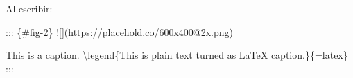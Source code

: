 \documentclass[
  letterpaper,
  DIV=11,
  numbers=noendperiod]{scrartcl}
\newenvironment{Shaded}{\begin{snugshade}}{\end{snugshade}}
\newcommand{\AlertTok}[1]{\textcolor[rgb]{0.68,0.00,0.00}{#1}}
\newcommand{\InformationTok}[1]{\textcolor[rgb]{0.37,0.37,0.37}{#1}}
\newcommand{\NormalTok}[1]{\textcolor[rgb]{0.00,0.23,0.31}{#1}}
\begin{document}
Al escribir:

\begin{Shaded}
\begin{Highlighting}[]
\NormalTok{::: \{\#fig{-}2\}}
\AlertTok{![](https://placehold.co/600x400@2x.png)}

\NormalTok{This is a caption.  }
\InformationTok{\textasciigrave{}\textbackslash{}legend\{This is plain text turned as LaTeX caption.\}\textasciigrave{}}\NormalTok{\{=latex\}}
\NormalTok{:::}
\end{Highlighting}
\end{Shaded}
\end{document}
